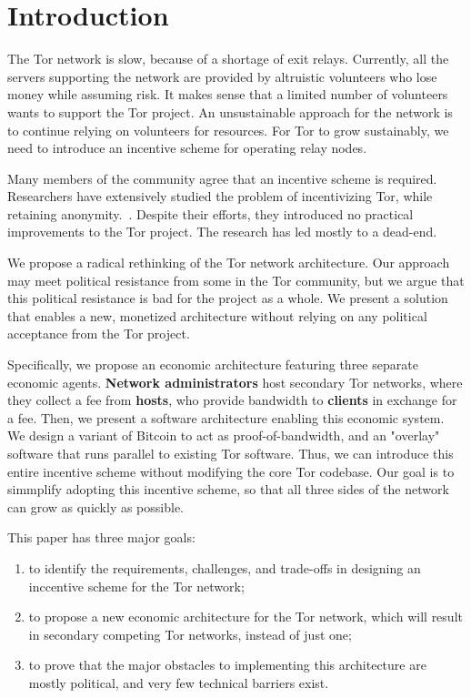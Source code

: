 \section{Introduction}

The Tor network is slow, because of a shortage of exit relays. Currently, all the servers supporting the network are provided by altruistic volunteers who lose money while assuming risk. It makes sense that a limited number of volunteers wants to support the Tor project. An unsustainable approach for the network is to continue relying on volunteers for resources. For Tor to grow sustainably, we need to introduce an incentive scheme for operating relay nodes. 

Many members of the community agree that an incentive scheme is required. Researchers have extensively studied the problem of incentivizing Tor, while retaining anonymity.~\cite{raykova-pet2008, wpes09-xpay, incentives-fc10,
ccs10-braids, acsac11-tortoise, jansen2013lira, johnson2013onions}. Despite their efforts, they introduced no practical improvements to the Tor project. The research has led mostly to a dead-end.

We propose a radical rethinking of the Tor network architecture. Our approach may meet political resistance from some in the Tor community, but we argue that this political resistance is bad for the project as a whole. We present a solution that enables a new, monetized architecture without relying on any political acceptance from the Tor project.

Specifically, we propose an economic architecture featuring three separate economic agents. \textbf{Network administrators} host secondary Tor networks, where they collect a fee from \textbf{hosts}, who provide bandwidth to \textbf{clients} in exchange for a fee. Then, we present a software architecture enabling this economic system. We design a variant of Bitcoin to act as proof-of-bandwidth, and an "overlay" software that runs parallel to existing Tor software. Thus, we can introduce this entire incentive scheme without modifying the core Tor codebase. Our goal is to simmplify adopting this incentive scheme, so that all three sides of the network can grow as quickly as possible.

This paper has three major goals:

\begin{enumerate}
\item to identify the requirements, challenges, and trade-offs in designing an inccentive scheme for the Tor network;
\item to propose a new economic architecture for the Tor network, which will result in secondary competing Tor networks, instead of just one;
\item to prove that the major obstacles to implementing this architecture are mostly political, and very few technical barriers exist.
\end{enumerate}

